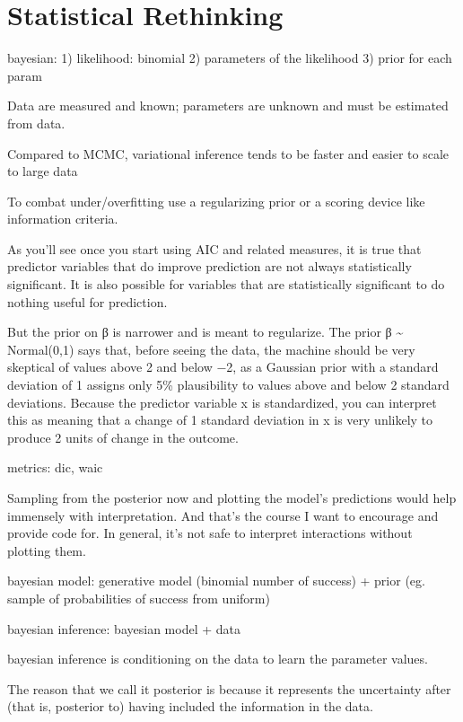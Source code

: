 \documentclass[]{book}
\begin{document}
\hypertarget{statistical-rethinking}{%
\section{Statistical Rethinking}\label{statistical-rethinking}}

bayesian: 1) likelihood: binomial 2) parameters of the likelihood 3) prior for each param

Data are measured and known; parameters are unknown and must be estimated from data.

Compared to MCMC, variational inference tends to be faster and easier to scale to large data

To combat under/overfitting use a regularizing prior or a scoring device like information criteria.

As you'll see once you start using AIC and related measures, it is true that predictor variables that do improve prediction are not always statistically significant. It is also possible for variables that are statistically significant to do nothing useful for prediction.

But the prior on β is narrower and is meant to regularize. The prior β \textasciitilde{} Normal(0,1) says that, before seeing the data, the machine should be very skeptical of values above 2 and below −2, as a Gaussian prior with a standard deviation of 1 assigns only 5\% plausibility to values above and below 2 standard deviations. Because the predictor variable x is standardized, you can interpret this as meaning that a change of 1 standard deviation in x is very unlikely to produce 2 units of change in the outcome.

metrics: dic, waic

Sampling from the posterior now and plotting the model's predictions would help immensely with interpretation. And that's the course I want to encourage and provide code for. In general, it's not safe to interpret interactions without plotting them.

bayesian model: generative model (binomial number of success) + prior (eg. sample of probabilities of success from uniform)

bayesian inference: bayesian model + data

bayesian inference is conditioning on the data to learn the parameter values.

The reason that we call it posterior is because it represents the uncertainty after (that is, posterior to) having included the information in the data.
\end{document}
